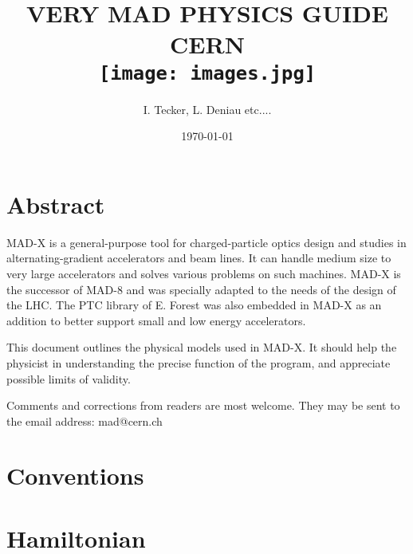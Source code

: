 \documentclass[12pt]{report}
\begin{document}


\title{
	{VERY MAD PHYSICS GUIDE}\\
	{\large CERN}\\
	{\texttt{[image: images.jpg]}}
}
\author{I. Tecker, L. Deniau etc....} 
\date{\ddmmyyyydate\today}
\maketitle
\thispagestyle{empty}


\chapter*{Abstract}
\par
MAD-X is a general-purpose tool for charged-particle optics design and studies in alternating-gradient accelerators and beam lines. It can handle medium size to very large accelerators and solves various problems on such machines. MAD-X is the successor of MAD-8 and was specially adapted to the needs of the design of the LHC. The PTC library of E. Forest was also embedded in MAD-X as an addition to better support small and low energy accelerators. 
\par
This document outlines the physical models used in MAD-X. It should help the physicist in understanding the precise function of the program, and appreciate possible limits of validity. 
\par
Comments and corrections from readers are most welcome. They may be sent to the email address: mad@cern.ch

\thispagestyle{empty}


\newpage
{}
\tableofcontents


\clearpage
\newpage
{}

\chapter{Conventions}

\chapter{Hamiltonian}


\clearpage


%
\end{document}

